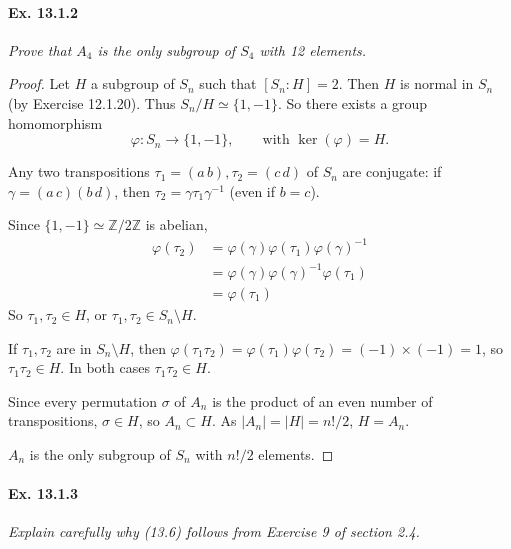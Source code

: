 \documentclass[11pt,a4paper]{article}
\newcommand{\Z}{\mathbb{Z}}
\begin{document}
\paragraph{Ex. 13.1.2}

{\it Prove that $A_4$ is the only subgroup of $S_4$ with 12 elements.
}

\begin{proof}
Let $H$ a subgroup of $S_n$ such that $[S_n:H]=2$. Then $H$ is normal in $S_n$ (by Exercise 12.1.20). Thus $S_n/H \simeq \{1,-1\}$. So there exists a group homomorphism 
$$\varphi:S_n \to \{1,-1\}, \qquad \text{with }\ker(\varphi) = H.$$

Any two transpositions $\tau_1 = (a\, b), \tau_2 = (c\, d)$ of $S_n$ are conjugate: if $\gamma = (a \, c)(b\,  d)$, then $\tau_2 = \gamma \tau_1 \gamma^{-1}$ (even if $b=c$).

Since  $ \{1,-1\} \simeq \Z/2\Z$ is abelian,
\begin{align*}
\varphi(\tau_2)  &= \varphi(\gamma) \varphi(\tau_1) \varphi(\gamma)^{-1}\\
&=  \varphi(\gamma) \varphi(\gamma)^{-1} \varphi(\tau_1) \\
&= \varphi(\tau_1)
\end{align*}
So $\tau_1, \tau_2 \in H$, or  $\tau_1, \tau_2 \in S_n  \setminus H$.

If $\tau_1, \tau_2$ are in $S_n\setminus H$, then $\varphi(\tau_1\tau_2) = \varphi(\tau_1)\varphi(\tau_2) = (-1)\times (-1) = 1$, so $\tau_1 \tau_2 \in H$. In both cases 
$\tau_1 \tau_2 \in H$. 

Since every permutation $\sigma$ of $A_n$ is the product of an even number of transpositions, $\sigma \in H$, so $A_n \subset H$. As $|A_n| = |H | = n!/2$, $H = A_n$.

$A_n$ is the only subgroup of $S_n$ with $n!/2$ elements.
\end{proof}

\paragraph{Ex. 13.1.3}

{\it Explain carefully why (13.6) follows from Exercise 9 of section 2.4.
}
\end{document}
